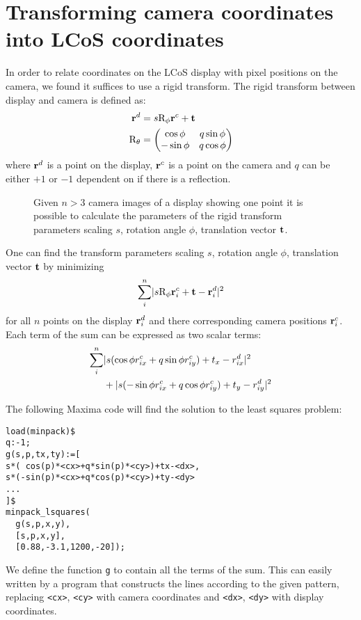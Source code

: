 \chapter{Transforming camera coordinates into LCoS coordinates}
\label{sec:rigid}
In order to relate coordinates on the LCoS display with pixel
positions on the camera, we found it suffices to use a rigid
transform. The rigid transform between display and camera is defined
as:
\begin{align}
  \mathbf{r}^d&=s \textrm{R}_\phi \mathbf{r}^c + \mathbf{t}\\
  \textrm{R}_\theta&=\begin{pmatrix}
  \cos\phi & q\sin\phi \\
  -\sin\phi & q\cos\phi \\ 
  \end{pmatrix}
\end{align}
where $\mathbf{r}^d$ is a point on the display, $\mathbf{r}^c$ is a point on the
camera and $q$ can be either $+1$ or $-1$ dependent on if there is a
reflection.

\begin{figure}[!hbt]
  \centering
  
  \caption{Given $n>3$ camera images of a display showing one point it
    is possible to calculate the parameters of the rigid transform
    parameters scaling $s$, rotation angle $\phi$, translation vector
    $\mathbf{t}$.}
  \label{fig:calib-align}
\end{figure}



One can find the transform parameters scaling $s$, rotation angle
$\phi$, translation vector $\mathbf{t}$ by minimizing
\begin{align}
  \sum_i^n \mathopen| s \textrm{R}_\phi \mathbf{r}^c_i+\mathbf{t} -\mathbf{r}^d_i \mathclose|^2
\end{align}
for all $n$ points on the display $\mathbf{r}^d_i$ and there corresponding
camera positions $\mathbf{r}^c_i$.  Each term of the sum can be expressed as
two scalar terms:
\begin{align*}
  \sum_i^n&
  \mathopen| s(\cos\phi r^c_{ix}+q\sin\phi r^c_{iy})+t_x-r^d_{ix} \mathclose|^2\\
  &+
  \mathopen| s(-\sin\phi r^c_{ix}+q\cos\phi r^c_{iy})+t_y-r^d_{iy} \mathclose|^2
\end{align*}

The following Maxima code will find the solution to the least squares
problem:
\begin{verbatim}
load(minpack)$
q:-1;
g(s,p,tx,ty):=[
s*( cos(p)*<cx>+q*sin(p)*<cy>)+tx-<dx>,
s*(-sin(p)*<cx>+q*cos(p)*<cy>)+ty-<dy>
...
]$
minpack_lsquares(
  g(s,p,x,y),
  [s,p,x,y],
  [0.88,-3.1,1200,-20]);
\end{verbatim}
We define the function \verb!g! to contain all the terms of the sum.
This can easily written by a program that constructs the lines
according to the given pattern, replacing \verb!<cx>!, \verb!<cy>!
with camera coordinates and \verb!<dx>!, \verb!<dy>! with display
coordinates.

